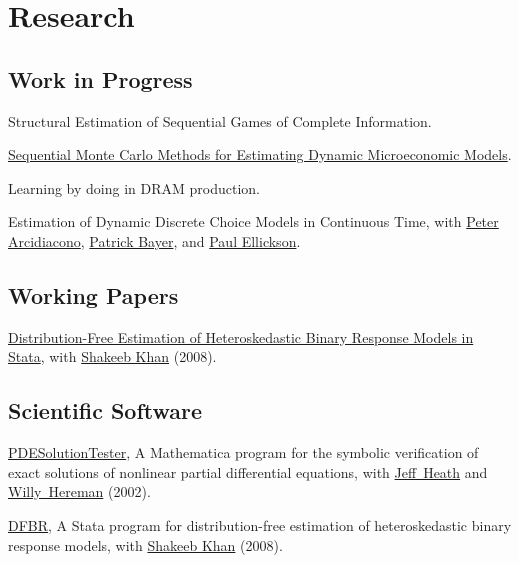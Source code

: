\documentclass[letterpaper]{article}
\renewenvironment{itemize}{
  \begin{list}{}{
    \setlength{\leftmargin}{1em}
  }
}{
  \end{list}
}
\begin{document}
\section*{Research}

\subsection*{Work in Progress}

\begin{itemize}
\item Structural Estimation of Sequential Games of Complete Information.
\item \href{http://jblevins.org/research/smcdmm}{Sequential Monte Carlo
    Methods for Estimating Dynamic Microeconomic Models}.
\item Learning by doing in DRAM production.
\item Estimation of Dynamic Discrete Choice Models in Continuous
  Time, with
  \href{http://www.econ.duke.edu/~psarcidi/}{Peter Arcidiacono},
  \href{http://www.econ.duke.edu/~pb29/}{Patrick Bayer}, and
  \href{http://www.econ.duke.edu/~paule/}{Paul Ellickson}.
\end{itemize}

\subsection*{Working Papers}

\begin{itemize}
\item \href{http://jblevins.org/research/dfbr}{Distribution-Free
    Estimation of Heteroskedastic Binary Response Models in Stata}, with
  \href{http://www.econ.duke.edu/~shakeebk/}{Shakeeb Khan} (2008).
\end{itemize}

\subsection*{Scientific Software}

\begin{itemize}
\item \href{http://jblevins.org/research/pdest}{PDESolutionTester}, A
  Mathematica program for the symbolic verification of exact solutions
  of nonlinear partial differential equations, with
  \href{http://web.centre.edu/jeffrey.heath/}{Jeff\ Heath} and
  \href{http://www.mines.edu/fs_home/whereman/}{Willy\ Hereman} (2002).
\item \href{http://jblevins.org/research/dfbr}{DFBR}, A Stata program
  for distribution-free estimation of heteroskedastic binary response
  models, with
  \href{http://www.econ.duke.edu/~shakeebk/}{Shakeeb Khan} (2008).
\end{itemize}
\end{document}
